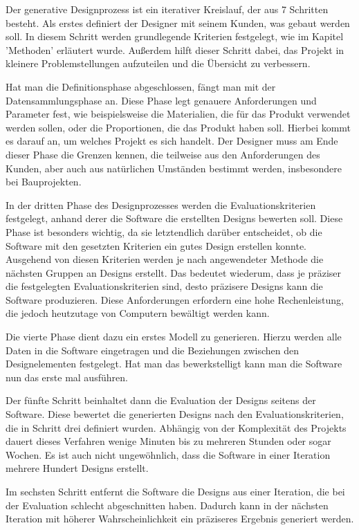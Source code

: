 Der generative Designprozess ist ein iterativer Kreislauf, der aus 7 Schritten besteht. Als erstes definiert der Designer mit seinem Kunden, was gebaut werden soll. In diesem Schritt werden grundlegende Kriterien festgelegt, wie im Kapitel 'Methoden' erläutert wurde. Außerdem hilft dieser Schritt dabei, das Projekt in kleinere Problemstellungen aufzuteilen und die Übersicht zu verbessern.

Hat man die Definitionsphase abgeschlossen, fängt man mit der Datensammlungsphase an. Diese Phase legt genauere Anforderungen und Parameter fest, wie beispielsweise die Materialien, die für das Produkt verwendet werden sollen, oder die Proportionen, die das Produkt haben soll. Hierbei kommt es darauf an, um welches Projekt es sich handelt. Der Designer muss am Ende dieser Phase die Grenzen kennen, die teilweise aus den Anforderungen des Kunden, aber auch aus natürlichen Umständen bestimmt werden, insbesondere bei Bauprojekten.

In der dritten Phase des Designprozesses werden die Evaluationskriterien festgelegt, anhand derer die Software die erstellten Designs bewerten soll. Diese Phase ist besonders wichtig, da sie letztendlich darüber entscheidet, ob die Software mit den gesetzten Kriterien ein gutes Design erstellen konnte. Ausgehend von diesen Kriterien werden je nach angewendeter Methode die nächsten Gruppen an Designs erstellt. Das bedeutet wiederum, dass je präziser die festgelegten Evaluationskriterien sind, desto präzisere Designs kann die Software produzieren. Diese Anforderungen erfordern eine hohe Rechenleistung, die jedoch heutzutage von Computern bewältigt werden kann. 

Die vierte Phase dient dazu ein erstes Modell zu generieren. Hierzu werden alle Daten in die Software eingetragen und die Beziehungen zwischen den Designelementen festgelegt. Hat man das bewerkstelligt kann man die Software nun das erste mal ausführen. 

Der fünfte Schritt beinhaltet dann die Evaluation der Designs seitens der Software. Diese bewertet die generierten Designs nach den Evaluationskriterien, die in Schritt drei definiert wurden. Abhängig von der Komplexität des Projekts dauert dieses Verfahren wenige Minuten bis zu mehreren Stunden oder sogar Wochen. Es ist auch nicht ungewöhnlich, dass die Software in einer Iteration mehrere Hundert Designs erstellt.

Im sechsten Schritt entfernt die Software die Designs aus einer Iteration, die bei der Evaluation schlecht abgeschnitten haben. Dadurch kann in der nächsten Iteration mit höherer Wahrscheinlichkeit ein präziseres Ergebnis generiert werden.

